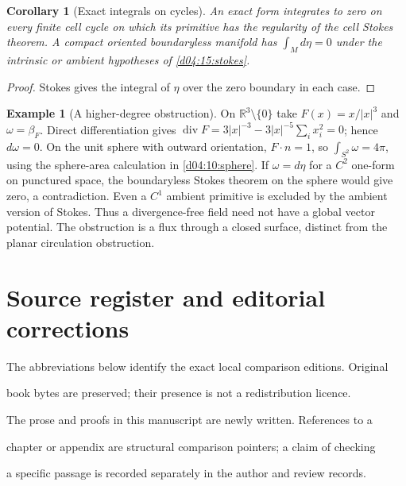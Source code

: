 \documentclass[11pt,oneside,openany]{book}
\newtheorem{corollary}[theorem]{Corollary}
\theoremstyle{definition}
\newtheorem{example}[theorem]{Example}
\theoremstyle{remark}
\newcommand{\R}{\mathbb R}
\begin{document}
\begin{corollary}[Exact integrals on cycles]\label{d04:15:exact-cycles}
An exact form integrates to zero on every finite cell cycle on which its
primitive has the regularity of the cell Stokes theorem. A compact oriented
boundaryless manifold has $\int_Md\eta=0$ under the intrinsic or ambient
hypotheses of \cref{d04:15:stokes}.
\end{corollary}
\begin{proof}
Stokes gives the integral of $\eta$ over the zero boundary in each case.
\end{proof}

\begin{example}[A higher-degree obstruction]\label{d04:15:radial-obstruction}
On $\R^3\setminus\{0\}$ take $F(x)=x/|x|^3$ and $\omega=\beta_F$.
Direct differentiation gives
$\operatorname{div}F=3|x|^{-3}-3|x|^{-5}\sum_i x_i^2=0$; hence
$d\omega=0$. On the unit sphere with outward orientation,
$F\cdot n=1$, so $\int_{S^2}\omega=4\pi$, using the sphere-area
calculation in \cref{d04:10:sphere}. If $\omega=d\eta$ for a $C^2$
one-form on punctured space, the boundaryless Stokes theorem on the sphere
would give zero, a contradiction. Even a $C^1$ ambient primitive is
excluded by the ambient version of Stokes. Thus a divergence-free field
need not have a global vector potential. The obstruction is a flux through
a closed surface, distinct from the planar circulation obstruction.
\end{example}


\backmatter

\chapter*{Source register and editorial corrections}


The abbreviations below identify the exact local comparison editions. Original

book bytes are preserved; their presence is not a redistribution licence.

The prose and proofs in this manuscript are newly written. References to a

chapter or appendix are structural comparison pointers; a claim of checking

a specific passage is recorded separately in the author and review records.
\end{document}

